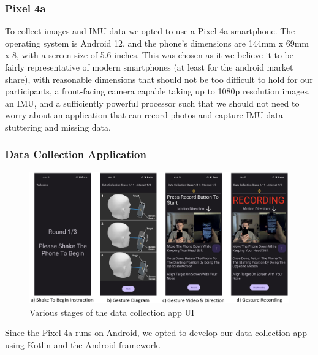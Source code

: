 \subsubsection{Pixel 4a}\nl
To collect images and IMU data we opted to use a Pixel 4a smartphone.
The operating system is Android 12, and the phone's dimensions are 144mm x 69mm x 8, with a screen size of 5.6 inches.
This was chosen as it we believe it to be fairly representative of modern smartphones (at least for the android market share), with reasonable dimensions that should not be too difficult to hold for our participants, a front-facing camera capable taking up to 1080p resolution images, an IMU, and a sufficiently powerful processor such that we should not need to worry about an application that can record photos and capture IMU data stuttering and missing data.

\subsubsection{Data Collection Application}\nl
\begin{figure}
    \centering
    \includegraphics[width=\textwidth]{figures/DataCollectionApp.png}
    \caption{\label{fig:data_collection_app} Various stages of the data collection app UI}
\end{figure}
Since the Pixel 4a runs on Android, we opted to develop our data collection app using Kotlin and the Android framework.

